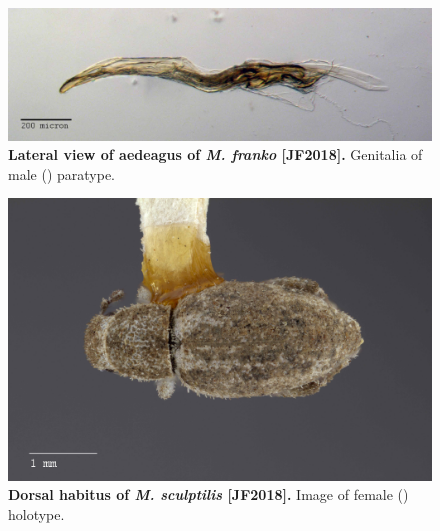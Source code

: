 \documentclass[fleqn,10pt,lineno]{wlpeerj} %
\begin{document}
\begin{figure}[h]
	\centering
	\begin{sideways}
		\includegraphics[width=0.95\textheight]{franko_aedeagus_lateral.jpg}
	\end{sideways}
	\caption{\textbf{Lateral view of aedeagus of \textit{M. franko} [JF2018].} Genitalia of male (\male) paratype.}
	\label{fig:franko_aedeagus_lateral}
\end{figure}

\begin{figure}[h]
	\begin{sideways}
		\centering
		\includegraphics[height=\textwidth]{sculptilis_F_dorsal.jpg}
	\end{sideways}
	\caption{\textbf{Dorsal habitus of \textit{M. sculptilis} [JF2018].} Image of female (\female) holotype.}
	\label{fig:sculptilis_F_dorsal}
\end{figure}
\end{document}
